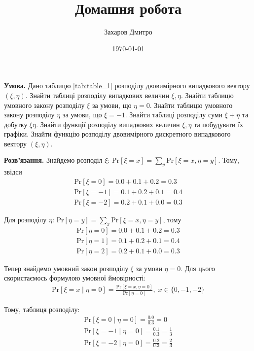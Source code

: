 \documentclass[oneside,solution]{karazin-prob-theory-assign}
\title{Домашня робота}
\author{Захаров Дмитро}
\date{\today}
\begin{document}
\maketitle



\hspace{20px}\textbf{Умова.} Дано таблицю \ref{tab:table_1} розподілу двовимірного випадкового вектору $(\xi,\eta)$. Знайти таблиці розподілу випадкових величин $\xi,\eta$. Знайти таблицю умовного закону розподілу $\xi$ за умови, що $\eta=0$. Знайти таблицю умовного закону розподілу $\eta$ за умови, що $\xi=-1$. Знайти таблиці розподілу суми $\xi+\eta$ та добутку $\xi\eta$. Знайти функції розподілу випадкових величин $\xi,\eta$ та
побудувати їх графіки. Знайти функцію розподілу двовимірного дискретного випадкового вектору $(\xi,\eta)$.

\textbf{Розв'язання.} Знайдемо розподіл $\xi$: $\text{Pr}[\xi = x] = \sum_{y} \text{Pr}[\xi = x, \eta = y]$. Тому, звідси
\begin{gather}
    \text{Pr}[\xi=0] = 0.0 + 0.1 + 0.2 = 0.3 \\
    \text{Pr}[\xi=-1] = 0.1 + 0.2 + 0.1 = 0.4 \\
    \text{Pr}[\xi=-2] = 0.2 + 0.1 + 0.0 = 0.3
\end{gather}

Для розподілу $\eta$: $\text{Pr}[\eta=y] = \sum_x \text{Pr}[\xi = x, \eta = y]$, тому 
\begin{gather}
    \text{Pr}[\eta=0] = 0.0 + 0.1 + 0.2 = 0.3 \\
    \text{Pr}[\eta=1] = 0.1 + 0.2 + 0.1 = 0.4 \\
    \text{Pr}[\eta=2] = 0.2 + 0.1 + 0.0 = 0.3
\end{gather}

Тепер знайдемо умовний закон розподілу $\xi$ за умови $\eta=0$. Для цього скористаємось формулою умовної ймовірності:
\begin{gather}
    \text{Pr}[\xi = x \mid \eta = 0] = \frac{\text{Pr}[\xi=x,\eta=0]}{\text{Pr}[\eta=0]}, \; x \in \{0,-1,-2\}
\end{gather}

Тому, таблиця розподілу:
\begin{gather}
    \text{Pr}[\xi=0 \mid \eta=0] = \frac{0.0}{0.3} = 0 \\
    \text{Pr}[\xi=-1 \mid \eta = 0] = \frac{0.1}{0.3} = \frac{1}{3}  \\
    \text{Pr}[\xi=-2 \mid \eta = 0] = \frac{0.2}{0.3} = \frac{2}{3}
\end{gather}
\end{document}
